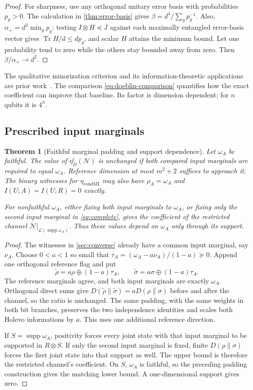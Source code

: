 \documentclass[11pt]{article}
\numberwithin{equation}{section}
\newtheorem{theorem}{Theorem}[section]
\theoremstyle{definition}
\theoremstyle{remark}
\DeclareMathOperator{\Tr}{Tr}
\DeclareMathOperator{\supp}{supp}
\newcommand{\N}{\mathcal N}
\newcommand{\etaC}{\eta_D^{\mathrm c}}
\newcommand{\etaCM}{\eta_{\mathrm{condMI}}}
\begin{document}
\begin{proof}
For sharpness, use any orthogonal unitary error basis with probabilities
$p_g>0$. The calculation in \cref{thm:error-basis} gives
$\beta=d^4/\sum_g p_g^{-1}$. Also,
$\alpha_+=d^2\min_g p_g$: testing $I\otimes H\preceq J$ against
each maximally entangled error-basis vector gives
$\Tr H/d\leq dp_g$, and scalar $H$ attains the minimum bound.
Let one probability tend to zero while the others stay bounded away
from zero. Then $\beta/\alpha_+\to d^2$.
\end{proof}

The qualitative minorization criterion and its information-theoretic
applications are prior work~\cite{GHNW26,HGNW26}. The comparison
\eqref{eq:doeblin-comparison} quantifies how the exact coefficient can improve
that baseline. Its factor is dimension dependent; for $n$ qubits it is $4^n$.

\subsection{Prescribed input marginals}

\begin{theorem}[Faithful marginal padding and support dependence]
\label{thm:prescribed}
Let $\omega_A$ be faithful. The value of $\etaC(\N)$ is unchanged
if both compared input marginals are required to equal $\omega_A$.
Reference dimension at most $m^2+2$ suffices to approach it.
The binary witnesses for $\etaCM$ may also have
$\rho_A=\omega_A$ and $I(U;A)=I(U;R)=0$ exactly.

For nonfaithful $\omega_A$, either fixing both input marginals to
$\omega_A$, or fixing only the second input marginal in
\eqref{eq:complete}, gives the coefficient of the restricted channel
$\N|_{\mathcal L(\supp\omega_A)}$.
Thus these values depend on $\omega_A$ only through its support.
\end{theorem}
\begin{proof}
The witnesses in \cref{sec:converse} already have a common input marginal,
say $\nu_A$. Choose $0<a<1$ so small that
$\tau_A=(\omega_A-a\nu_A)/(1-a)\succeq0$.
Append one orthogonal reference flag and put
\[
 \widetilde\rho=a\rho\oplus(1-a)\tau_A,\qquad
 \widetilde\sigma=a\sigma\oplus(1-a)\tau_A.
\]
The reference marginals agree, and both input marginals are exactly
$\omega_A$. Orthogonal direct sums give
$D(\widetilde\rho\|\widetilde\sigma)=aD(\rho\|\sigma)$
before and after the channel, so the ratio is unchanged.
The same padding, with the same weights in both bit branches, preserves
the two independence identities and scales both Holevo informations by
$a$. This uses one additional reference direction.

If $S=\supp\omega_A$, positivity forces every joint state with that
input marginal to be supported in $R\otimes S$. If only the second
input marginal is fixed, finite $D(\rho\|\sigma)$ forces the first
joint state into that support as well. The upper bound is therefore
the restricted channel's coefficient. On $S$, $\omega_A$ is faithful,
so the preceding padding construction gives the matching lower bound.
A one-dimensional support gives zero.
\end{proof}
\end{document}
